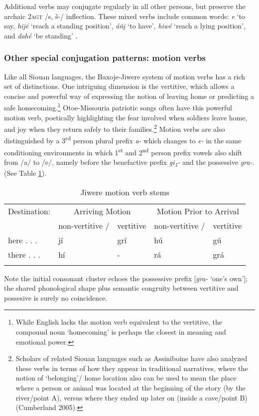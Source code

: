 \documentclass[output=paper]{LSP/langsci}
\begin{document}
Additional verbs may conjugate regularly in all other persons, but preserve the archaic \textsc{2agt} /s, \v{s}-/ inflection.  These mixed verbs include common words: \textit{e} `to say, \textit{hij\'e} `reach a standing position', \textit{\'a\~n\k{i}} `to have', \textit{hiw\'e} `reach  a lying position', and \textit{dah\'e} `be standing' \citep[243]{Whitman1946}.

\subsubsection{Other special conjugation patterns:  motion verbs} 	               		                   
Like all Siouan languages, the Baxoje-Jiwere system of motion verbs has a rich set of distinctions. One intriguing dimension is the vertitive, which allows a concise and powerful way of expressing the notion of leaving home or predicting a safe homecoming.\footnote{While English lacks the motion verb equivalent to the vertitive, the compound noun `homecoming' is perhaps the closest in meaning and emotional power.}  Otoe-Missouria patriotic songs often have this powerful motion verb, poetically highlighting the fear involved when soldiers leave home, and joy when they return safely to their families.\footnote{Scholars of related Siouan languages such as Assiniboine have also analyzed these verbs in terms of how they appear in traditional narratives, where the notion of `belonging'/ home location also can be used to mean the place where a person or animal was located at the beginning of the story (by the river/point A), versus where they ended up later on (inside a cave/point B) (Cumberland 2005).} Motion verbs are also distinguished by a 3\textsuperscript{rd} person plural prefix \textit{a-} which changes to \textit{e-} in the same conditioning environments in which 1\textsuperscript{st} and 2\textsuperscript{nd} person prefix vowels also shift from /a/ to /e/, namely before the benefactive prefix \textit{gi\textsubscript{1}-} and the possessive \textit{gra-}. (See Table \ref{motionverb}).

\begin{table} 
\begin{tabular}{ l l l l l }
\lsptoprule
 Destination: & \multicolumn{2}{c}{Arriving Motion} & \multicolumn{2}{c}{Motion Prior to Arrival} \\
& non-vertitive / & vertitive & non-vertitive / & vertitive \\
\midrule
here . . . 	& j\'i  & gr\'i & h\'u &  g\'u \\
there . . . 	& h\'i &   -  & r\'a & gr\'a \\
\lspbottomrule
\end{tabular}
\caption{Jiwere motion verb stems \citep[293]{Taylor1976}} \label{motionverb}
\end{table}
Note the initial consonant cluster echoes the possessive prefix [\textit{gra-} `one's own']; the shared phonological shape plus semantic congruity between vertitive and possesive is surely no coincidence.  
\end{document}
